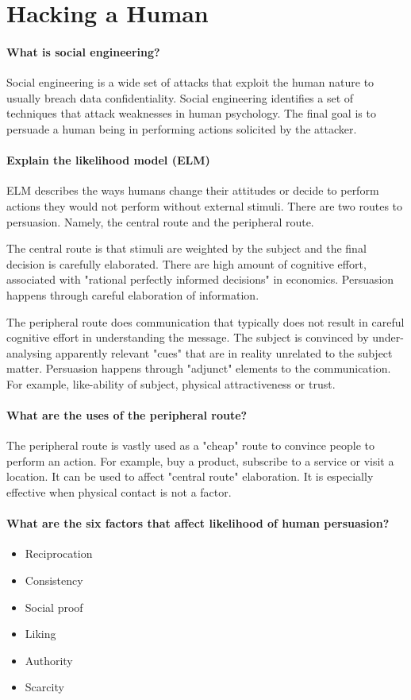 \section{Hacking a Human}
\paragraph{What is social engineering?}
Social engineering is a wide set of attacks that exploit the human nature to usually breach data confidentiality. Social engineering identifies a set of techniques that attack weaknesses in human psychology. The final goal is to persuade a human being in performing actions solicited by the attacker.

\paragraph{Explain the likelihood model (ELM)}
ELM describes the ways humans change their attitudes or decide to perform actions they would not perform without external stimuli. There are two routes to persuasion. Namely, the central route and the peripheral route.

The central route is that stimuli are weighted by the subject and the final decision is carefully elaborated. There are high amount of cognitive effort, associated with "rational perfectly informed decisions" in economics. Persuasion happens through careful elaboration of information.

The peripheral route does communication that typically does not result in careful cognitive effort in understanding the message. The subject is convinced by under-analysing apparently relevant "cues" that are in reality unrelated to the subject matter. Persuasion happens through "adjunct" elements to the communication. For example, like-ability of subject, physical attractiveness or trust.

\paragraph{What are the uses of the peripheral route?}
The peripheral route is vastly used as a "cheap" route to convince people to perform an action. For example, buy a product, subscribe to a service or visit a location. It can be used to affect "central route" elaboration. It is especially effective when physical contact is not a factor. 

\paragraph{What are the six factors that affect likelihood of human persuasion?}
\begin{itemize}
	\item Reciprocation
	\item Consistency
	\item Social proof
	\item Liking
	\item Authority
	\item Scarcity
\end{itemize}

